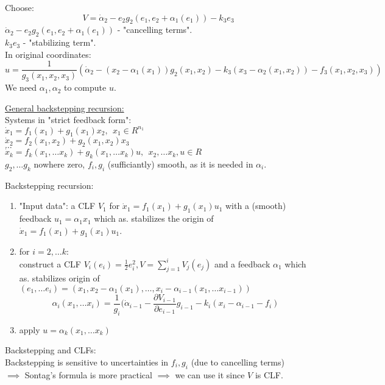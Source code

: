 Choose:
$$V = \dot \alpha_2 - e_2g_2(e_1,e_2+\alpha_1(e_1))-k_3e_3$$
$\dot \alpha_2 - e_2g_2(e_1,e_2+\alpha_1(e_1))$ - "cancelling terms".\\
$k_3e_3$ - "stabilizing term".\\

In original coordinates:\\
$$u=\frac{1}{g_3(x_1,x_2,x_3)}(\dot \alpha_2 - (x_2- \alpha_1(x_1))g_2(x_1,x_2)-k_3(x_3- \alpha_2(x_1,x_2))-f_3(x_1,x_2,x_3))$$
We need $\alpha_1, \alpha_2$ to compute $u$.

\underline{General backstepping recursion:}\\
Systems in "strict feedback form":\\
$\dot x_1 = f_1(x_1)+g_1(x_1)x_2, \ \ x_1 \in R^{n_1}$\\
$\dot x_2 = f_2(x_1,x_2)+g_2(x_1,x_2)x_3$\\
$\dots$\\
$\dot x_k = f_k(x_1,\dots x_k)+g_k(x_1,\dots x_k)u, \ \ x_2, \dots x_k, u \in R$\\
$g_2, \dots g_k$ nowhere zero, $f_i,g_i$ (sufficiantly) smooth, as it is needed in $\alpha_i$.


Backstepping recursion:
\begin{enumerate}
    \item "Input data": a CLF $V_1$ for $\dot x_1 = f_1(x_1)+g_1(x_1)u_1$ with a (smooth) feedback $u_1=\alpha_1x_1$ which as. stabilizes the origin of $\dot x_1 = f_1(x_1)+g_1(x_1)u_1$.
    \item for $i=2, \dots k$:\\
    construct a CLF $V_i(e_i)=\frac{1}{2}e_i^2, V = \sum \limits_{j=1}^iV_j(e_j)$ and a feedback $\alpha_1$ which as. stabilizes origin of $(e_1, \dots e_i) = (x_1,x_2-\alpha_1(x_1), \dots, x_i - \alpha_{i-1}(x_1, \dots x_{i-1}))$
    $$\alpha_i(x_1, \dots x_i) = \frac{1}{g_i}(\dot \alpha_{i-1} - \frac{\partial V_{i-1}}{\partial e_{i-1}}g_{i-1}-k_i(x_i-\alpha_{i-1}-f_i)$$
    \item apply $u=\alpha_k(x_1, \dots x_k)$
\end{enumerate}

Backstepping and CLFs:\\
Backstepping is sensitive to uncertainties in $f_i,g_i$ (due to cancelling terms)\\
$\implies$  Sontag's formula is more practical $\implies$ we can use it since $V$ is CLF. \\

